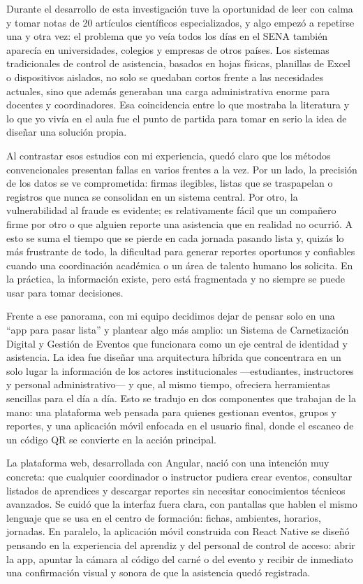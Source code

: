 Durante el desarrollo de esta investigación tuve la oportunidad de leer con calma y tomar notas de 20 artículos científicos especializados, y algo empezó a repetirse una y otra vez: el problema que yo veía todos los días en el SENA también aparecía en universidades, colegios y empresas de otros países. Los sistemas tradicionales de control de asistencia, basados en hojas físicas, planillas de Excel o dispositivos aislados, no solo se quedaban cortos frente a las necesidades actuales, sino que además generaban una carga administrativa enorme para docentes y coordinadores. Esa coincidencia entre lo que mostraba la literatura y lo que yo vivía en el aula fue el punto de partida para tomar en serio la idea de diseñar una solución propia.

Al contrastar esos estudios con mi experiencia, quedó claro que los métodos convencionales presentan fallas en varios frentes a la vez. Por un lado, la precisión de los datos se ve comprometida: firmas ilegibles, listas que se traspapelan o registros que nunca se consolidan en un sistema central. Por otro, la vulnerabilidad al fraude es evidente; es relativamente fácil que un compañero firme por otro o que alguien reporte una asistencia que en realidad no ocurrió. A esto se suma el tiempo que se pierde en cada jornada pasando lista y, quizás lo más frustrante de todo, la dificultad para generar reportes oportunos y confiables cuando una coordinación académica o un área de talento humano los solicita. En la práctica, la información existe, pero está fragmentada y no siempre se puede usar para tomar decisiones.

Frente a ese panorama, con mi equipo decidimos dejar de pensar solo en una “app para pasar lista” y plantear algo más amplio: un Sistema de Carnetización Digital y Gestión de Eventos que funcionara como un eje central de identidad y asistencia. La idea fue diseñar una arquitectura híbrida que concentrara en un solo lugar la información de los actores institucionales —estudiantes, instructores y personal administrativo— y que, al mismo tiempo, ofreciera herramientas sencillas para el día a día. Esto se tradujo en dos componentes que trabajan de la mano: una plataforma web pensada para quienes gestionan eventos, grupos y reportes, y una aplicación móvil enfocada en el usuario final, donde el escaneo de un código QR se convierte en la acción principal.

La plataforma web, desarrollada con Angular, nació con una intención muy concreta: que cualquier coordinador o instructor pudiera crear eventos, consultar listados de aprendices y descargar reportes sin necesitar conocimientos técnicos avanzados. Se cuidó que la interfaz fuera clara, con pantallas que hablen el mismo lenguaje que se usa en el centro de formación: fichas, ambientes, horarios, jornadas. En paralelo, la aplicación móvil construida con React Native se diseñó pensando en la experiencia del aprendiz y del personal de control de acceso: abrir la app, apuntar la cámara al código del carné o del evento y recibir de inmediato una confirmación visual y sonora de que la asistencia quedó registrada.

